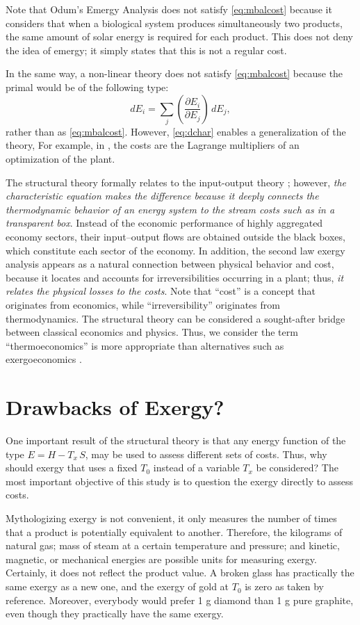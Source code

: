 \documentclass[energies,article,submit,moreauthors,pdftex]{Definitions/mdpi}
\newcommand{\dpartial}[2]{\left(\dfrac{\partial E_{#1}}{\partial E_{#2}}\right)}
\begin{document}
Note that Odum's Emergy Analysis \cite{Odum1988,Brown1996} does not satisfy \eqref{eq:mbalcost} because it considers that when a biological system produces simultaneously two products, the same amount of solar energy is required for each product. This does not deny the idea of emergy; it simply states that this is not a regular cost.

In the same way, a non-linear theory does not satisfy \cref{eq:mbalcost} because the primal would be of the following type:
\begin{equation}
dE_i=\sum_j \dpartial{i}{j}\, dE_j,
\label{eq:dchar}
\end{equation}
rather than as \cref{eq:mbalcost}. However, \cref{eq:dchar} enables a generalization of the theory, For example, in \cite{Valero1993}, the costs are the Lagrange multipliers of an optimization of the plant.

The structural theory formally relates to the input-output theory \cite{Leontief1970}; however, \emph{the characteristic equation makes the difference because it deeply connects the thermodynamic behavior of an energy system to the stream costs such as in a transparent box}. Instead of the economic performance of highly aggregated economy sectors, their input–output flows are obtained outside the black boxes, which constitute each sector of the economy. In addition, the second law exergy analysis appears as a natural connection between physical behavior and cost, because it locates and accounts for irreversibilities occurring in a plant; thus, \emph{it relates the physical losses to the costs}. Note that “cost” is a concept that originates from economics, while “irreversibility” originates from thermodynamics. The structural theory can be considered a sought-after bridge between classical economics and physics. Thus, we consider the term “thermoeconomics” is more appropriate than alternatives such as exergoeconomics \cite{Tsatsaronis2007}.


\section{Drawbacks of Exergy?}
One important result of the structural theory is that any energy function of the type ${E=H-T_x\,S}$, may be used to assess different sets of costs. Thus, why should exergy that uses a fixed $T_0$ instead of a variable $T_x$ be considered? The most important objective of this study is to question the exergy directly to assess costs.

Mythologizing exergy is not convenient, it only measures the number of times that a product is potentially equivalent to another. Therefore, the kilograms of natural gas; mass of steam at a certain temperature and pressure; and kinetic, magnetic, or mechanical energies are possible units for measuring exergy. Certainly, it does not reflect the product value. A broken glass has practically the same exergy as a new one, and the  exergy of gold at $T_0$ is zero as taken by reference. Moreover, everybody would prefer 1 g diamond than 1 g pure graphite, even though they practically have the same exergy.
\end{document}
